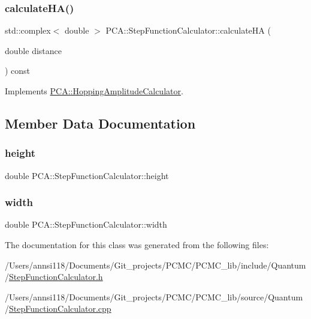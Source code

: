\subsubsection{\texorpdfstring{calculate\+H\+A()}{calculateHA()}}
{\footnotesize\ttfamily std\+::complex$<$ double $>$ P\+C\+A\+::\+Step\+Function\+Calculator\+::calculate\+HA (\begin{DoxyParamCaption}\item[{double}]{distance }\end{DoxyParamCaption}) const\hspace{0.3cm}{\ttfamily [virtual]}}



Implements \hyperlink{class_p_c_a_1_1_hopping_amplitude_calculator_ae925735be8ef006f3f8dfdc1a23cae89}{P\+C\+A\+::\+Hopping\+Amplitude\+Calculator}.



\subsection{Member Data Documentation}
\hypertarget{class_p_c_a_1_1_step_function_calculator_a856f54997b5f0bfbe81040fa55f09146}{}\label{class_p_c_a_1_1_step_function_calculator_a856f54997b5f0bfbe81040fa55f09146} 
\subsubsection{\texorpdfstring{height}{height}}
{\footnotesize\ttfamily double P\+C\+A\+::\+Step\+Function\+Calculator\+::height\hspace{0.3cm}{\ttfamily [private]}}

\hypertarget{class_p_c_a_1_1_step_function_calculator_a777b92937ec96bdc1dc8f887affcb8b3}{}\label{class_p_c_a_1_1_step_function_calculator_a777b92937ec96bdc1dc8f887affcb8b3} 
\subsubsection{\texorpdfstring{width}{width}}
{\footnotesize\ttfamily double P\+C\+A\+::\+Step\+Function\+Calculator\+::width\hspace{0.3cm}{\ttfamily [private]}}



The documentation for this class was generated from the following files\+:\begin{DoxyCompactItemize}
\item 
/\+Users/annsi118/\+Documents/\+Git\+\_\+projects/\+P\+C\+M\+C/\+P\+C\+M\+C\+\_\+lib/include/\+Quantum/\hyperlink{_step_function_calculator_8h}{Step\+Function\+Calculator.\+h}\item 
/\+Users/annsi118/\+Documents/\+Git\+\_\+projects/\+P\+C\+M\+C/\+P\+C\+M\+C\+\_\+lib/source/\+Quantum/\hyperlink{_step_function_calculator_8cpp}{Step\+Function\+Calculator.\+cpp}\end{DoxyCompactItemize}
